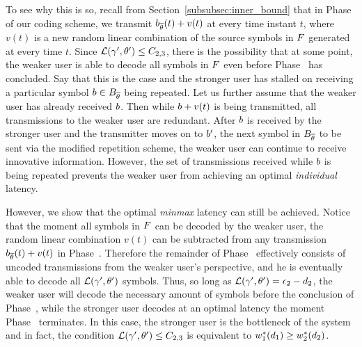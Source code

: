 To see why this is so, recall from Section~\ref{subsubsec:inner_bound} that in Phase~ of our coding scheme, we transmit $b_{\overline{\theta}}(t) + v(t)$ at every time instant $t$, where $v(t)$ is a new random linear combination of the source symbols in $F$ generated at every time $t$.  Since $\mathcal{L}(\gamma', \theta') \leq C_{2, 3}$, there is the possibility that at some point, the weaker user is able to decode all symbols in $F$ even before Phase~ has concluded.  Say that this is the case and the stronger user has stalled on receiving a particular symbol $b \in B_{\overline{\theta}}$ being repeated.  Let us further assume that the weaker user has already received $b$.  Then while $b + v(t)$ is being transmitted, all transmissions to the weaker user are redundant.
After $b$ is received by the stronger user and the transmitter moves on to  $b'$, the next symbol in $B_{\overline{\theta}}$ to be sent via the modified repetition scheme, the weaker user can continue to receive innovative information.  However, the set of transmissions received while $b$ is being repeated prevents the weaker user from achieving an optimal \emph{individual} latency.

However, we show that the optimal \emph{minmax} latency can still be achieved.  Notice that the moment all symbols in $F$ can be decoded by the weaker user, the random linear combination $v(t)$ can be subtracted from any transmission $b_{\overline{\theta}}(t) + v(t)$ in Phase~.  Therefore the remainder of Phase~ effectively consists of uncoded transmissions from the weaker user's perspective, and he is eventually able to decode all $\mathcal{L}(\gamma', \theta')$ symbols.  Thus, so long as $\mathcal{L}(\gamma', \theta') = \epsilon_2 - d_2$, the weaker user will decode the necessary amount of symbols before the conclusion of Phase~, while the stronger user decodes at an optimal latency the moment Phase~ terminates.  In this case, the stronger user is the bottleneck of the system and in fact, the condition $\mathcal{L}(\gamma', \theta') \leq C_{2, 3}$ is equivalent to $w_{1}^{*}(d_1)\geq w_{2}^{*}(d_2)$.  



